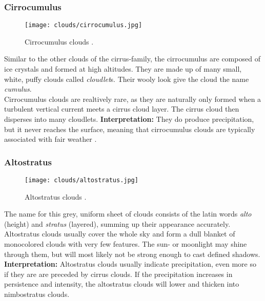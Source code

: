 \subsubsection{Cirrocumulus}
\begin{wrapfigure}[10]{r}{6.3cm}
    \vspace{-\baselineskip}
    \texttt{[image: clouds/cirrocumulus.jpg]}
    \caption{Cirrocumulus clouds \protect\cite{cloudtypes:wiki:cirrocumulus}.}
    \label{img:clouds:cirrocumulus}
\end{wrapfigure}
Similar to the other clouds of the cirrus-family, the cirrocumulus are composed of ice crystals and formed at high \gls{altitude}s.
They are made up of many small, white, puffy clouds called \emph{\gls{cloudlet}}s. Their wooly look give the cloud the name \emph{cumulus}.
\\
\noindent
Cirrocumulus clouds are realtively rare, as they are naturally only formed when a turbulent vertical current meets a cirrus cloud layer. The cirrus cloud then disperses into many \gls{cloudlet}s.
\emptyline
\textbf{Interpretation:} 
They do produce \gls{precipitation}, but it never reaches the surface, meaning that cirrocumulus clouds are typically associated with fair weather \cite{cloudtypes:meteoblue}.

\clearpage

\subsubsection{Altostratus}
\begin{wrapfigure}[11]{r}{6.3cm}
    \vspace{-\baselineskip}
    \texttt{[image: clouds/altostratus.jpg]}
    \caption{Altostratus clouds \protect\cite{cloudtypes:meteoblue}.}
    \label{img:clouds:altostratus}
\end{wrapfigure}
The name for this grey, uniform sheet of clouds consists of the latin words \emph{alto} (height) and \emph{stratus} (layered), summing up their appearance accurately.
Altostratus clouds usually cover the whole sky and form a dull blanket of monocolored clouds with very few features.
The sun- or moonlight may shine through them, but will most likely not be strong enough to cast defined shadows.
\emptyline
\textbf{Interpretation:}
Altostratus clouds usually indicate \gls{precipitation}, even more so if they are are preceded by cirrus clouds.
If the \gls{precipitation} increases in persistence and intensity, the altostratus clouds will lower and thicken into nimbostratus clouds.


